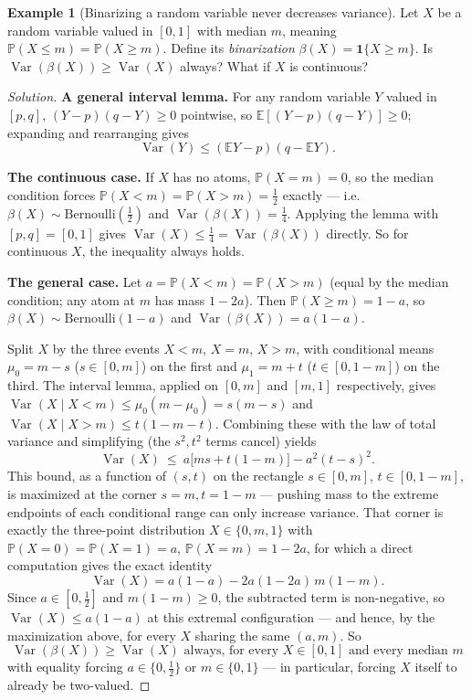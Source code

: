 \documentclass[11pt]{article}
\theoremstyle{definition}
\newtheorem{example}{Example}[section]
\newcommand{\E}{\mathbb{E}}
\newcommand{\Var}{\operatorname{Var}}
\begin{document}
\begin{example}[Binarizing a random variable never decreases variance]
Let $X$ be a random variable valued in $[0,1]$ with median $m$, meaning $\mathbb P(X\le m)=\mathbb P(X\ge m)$. Define its \emph{binarization} $\beta(X)=\mathbf 1\{X\ge m\}$. Is $\Var(\beta(X))\ge\Var(X)$ always? What if $X$ is continuous?
\end{example}

\begin{proof}[Solution]
\textbf{A general interval lemma.} For any random variable $Y$ valued in $[p,q]$, $(Y-p)(q-Y)\ge0$ pointwise, so $\E[(Y-p)(q-Y)]\ge0$; expanding and rearranging gives
\[
\Var(Y)\le(\E Y-p)(q-\E Y).
\]

\textbf{The continuous case.} If $X$ has no atoms, $\mathbb P(X=m)=0$, so the median condition forces $\mathbb P(X<m)=\mathbb P(X>m)=\tfrac12$ exactly — i.e.\ $\beta(X)\sim\mathrm{Bernoulli}(\tfrac12)$ and $\Var(\beta(X))=\tfrac14$. Applying the lemma with $[p,q]=[0,1]$ gives $\Var(X)\le\tfrac14=\Var(\beta(X))$ directly. So for continuous $X$, the inequality always holds.

\textbf{The general case.} Let $a=\mathbb P(X<m)=\mathbb P(X>m)$ (equal by the median condition; any atom at $m$ has mass $1-2a$). Then $\mathbb P(X\ge m)=1-a$, so $\beta(X)\sim\mathrm{Bernoulli}(1-a)$ and $\Var(\beta(X))=a(1-a)$.

Split $X$ by the three events $X<m$, $X=m$, $X>m$, with conditional means $\mu_0=m-s$ ($s\in[0,m]$) on the first and $\mu_1=m+t$ ($t\in[0,1-m]$) on the third. The interval lemma, applied on $[0,m]$ and $[m,1]$ respectively, gives $\Var(X\mid X<m)\le\mu_0(m-\mu_0)=s(m-s)$ and $\Var(X\mid X>m)\le t(1-m-t)$. Combining these with the law of total variance and simplifying (the $s^2,t^2$ terms cancel) yields
\[
\Var(X)\ \le\ a\bigl[ms+t(1-m)\bigr]-a^2(t-s)^2.
\]
This bound, as a function of $(s,t)$ on the rectangle $s\in[0,m]$, $t\in[0,1-m]$, is maximized at the corner $s=m,t=1-m$ — pushing mass to the extreme endpoints of each conditional range can only increase variance. That corner is exactly the three-point distribution $X\in\{0,m,1\}$ with $\mathbb P(X=0)=\mathbb P(X=1)=a$, $\mathbb P(X=m)=1-2a$, for which a direct computation gives the exact identity
\[
\Var(X)=a(1-a)-2a(1-2a)\,m(1-m).
\]
Since $a\in[0,\tfrac12]$ and $m(1-m)\ge0$, the subtracted term is non-negative, so $\Var(X)\le a(1-a)$ at this extremal configuration — and hence, by the maximization above, for every $X$ sharing the same $(a,m)$. So
\[
\boxed{\Var(\beta(X))\ge\Var(X)\text{ always, for every }X\in[0,1]\text{ and every median }m}
\]
with equality forcing $a\in\{0,\tfrac12\}$ or $m\in\{0,1\}$ — in particular, forcing $X$ itself to already be two-valued.
\end{proof}
\end{document}
